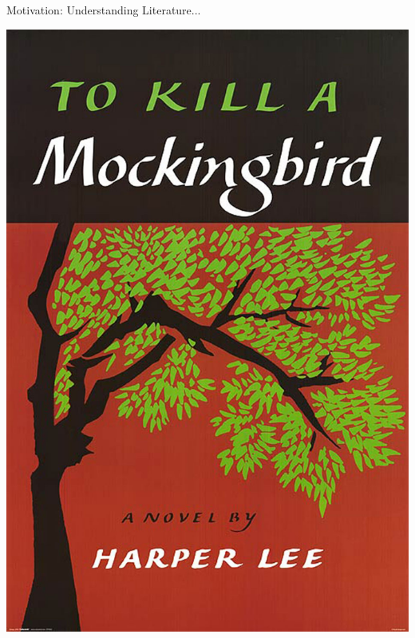 \documentclass[xcolor=x11names]{beamer}
\begin{document}
\begin{frame}{Motivation: Understanding Literature...}
\begin{center}
  \includegraphics[height=0.8\textheight]{res/to-kill-a-mockingbird-cover.jpg}
  \hspace*{2em}

\end{center}
\end{frame}
\end{document}

